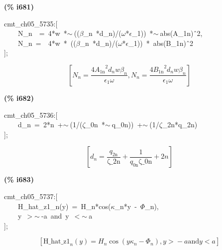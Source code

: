\documentclass[fleqn]{article}
\begin{document}
\noindent
\begin{minipage}[t]{4.000000em}\color{red}\bfseries
(\% i681)	
\end{minipage}
\begin{minipage}[t]{\textwidth}\color{blue}
cmt\_ch05\_5735:[\\
\ \ \ \ N\_n\ \ =\ 4*w\ *\ensuremath{\sim\ }((\ensuremath{\beta}\_n\ *d\_n)/(\ensuremath{\omega}*\ensuremath{\epsilon}\_1))\ *\ensuremath{\sim\ }abs(A\_1n)\^\ 2,\\
\ \ \ \ N\_n\ =\ \ 4*w\ *\ ((\ensuremath{\beta}\_n\ *d\_n)/(\ensuremath{\omega}*\ensuremath{\epsilon}\_1))\ *\ abs(B\_1n)\^\ 2\\
];
\end{minipage}
\[\displaystyle \tag{\% o681} 
\left[ {N_n}=\frac{4 {{{A_{\ensuremath{\mathrm{1n}}}}}^{2}} {d_n} w {{\beta }_n}}{{{\epsilon }_1} \omega }\operatorname{,}{N_n}=\frac{4 {{{B_{\ensuremath{\mathrm{1n}}}}}^{2}} {d_n} w {{\beta }_n}}{{{\epsilon }_1} \omega }\right] \mbox{}
\]


\noindent
\begin{minipage}[t]{4.000000em}\color{red}\bfseries
(\% i682)	
\end{minipage}
\begin{minipage}[t]{\textwidth}\color{blue}
cmt\_ch05\_5736:[\\
\ \ \ \ d\_n\ =\ 2*n\ +\ensuremath{\sim\ }(1/(\ensuremath{\zeta}\_0n\ *\ensuremath{\sim\ }q\_0n))\ +\ensuremath{\sim\ }(1/\ensuremath{\zeta}\_2n*q\_2n)\\
];
\end{minipage}
\[\displaystyle \tag{\% o682} 
\left[ {d_n}=\frac{{q_{\ensuremath{\mathrm{2n}}}}}{\ensuremath{\mathrm{\zeta \_ 2n}}}+\frac{1}{{q_{\ensuremath{\mathrm{0n}}}} \ensuremath{\mathrm{\zeta \_ 0n}}}+2 n\right] \mbox{}
\]


\noindent
\begin{minipage}[t]{4.000000em}\color{red}\bfseries
(\% i683)	
\end{minipage}
\begin{minipage}[t]{\textwidth}\color{blue}
cmt\_ch05\_5737:[\\
\ \ \ \ H\_hat\_z1\_n(y)\ =\ H\_n*cos(\ensuremath{\kappa}\_n*y\ -\ \ensuremath{\Phi}\_n),\\
\ \ \ \ y\ \ensuremath{>}\ensuremath{\sim\ }-a\ and\ y\ \ensuremath{<}\ensuremath{\sim\ }a\\
];
\end{minipage}
\[\displaystyle \tag{\% o683} 
\left[ {{\ensuremath{\mathrm{H\_ hat\_ z1}}}_n}(y)={H_n} \cos{\left( y {{\kappa }_n}-{{\Phi }_n}\right) }\operatorname{,}y\operatorname{>  }-a\ensuremath{\mathrm{ and }}y\operatorname{<  }a\right] \mbox{}
\]
\end{document}
